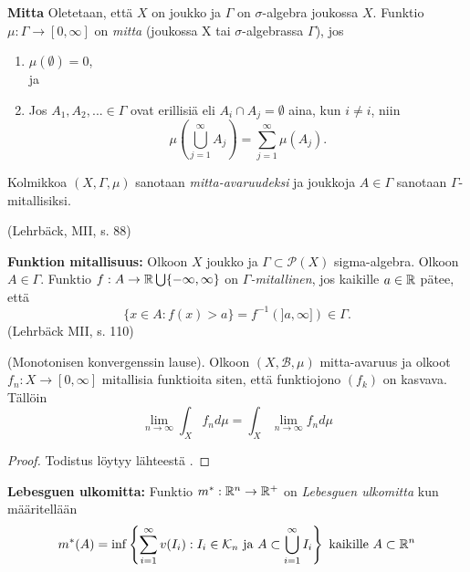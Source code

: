 \begin{definition}
    \textbf{Mitta} Oletetaan, että $X$ on joukko ja $\Gamma$ on $\sigma$-algebra joukossa $X$. Funktio $\mu : \Gamma \to [0, \infty]$ on \textit{mitta} (joukossa X tai $\sigma$-algebrassa $\Gamma$), jos 
    \begin{enumerate}
        \item $\mu(\emptyset) = 0$, \\
        ja
        \item Jos $A_1, A_2, ... \in \Gamma$ ovat erillisiä eli $A_i \cap A_j = \emptyset$ aina, kun $i \ne i$, niin
        $$\mu\left(\bigcup_{j=1}^\infty A_j \right) = \sum_{j=1}^\infty \mu(A_j).$$
    \end{enumerate}
    
    Kolmikkoa $(X,\Gamma, \mu)$ sanotaan \textit{mitta-avaruudeksi} ja joukkoja $A\in \Gamma$ sanotaan $\Gamma$-mitallisiksi.
    
    (Lehrbäck, MII, s. 88)
\end{definition}

\begin{definition}
    \textbf{Funktion mitallisuus:} Olkoon $X$ joukko ja $\Gamma \subset \mathcal P (X)$ sigma-algebra. Olkoon $A\in \Gamma$. Funktio $f: A \to \mathbb{R} \bigcup\{-\infty, \infty\}$ on \textit{$\Gamma$-mitallinen}, jos kaikille $a \in \mathbb{R}$ pätee, että
    \begin{equation*}
        \{x \in A : f(x) > a\} = f^{-1}(]a, \infty]) \in \Gamma.
    \end{equation*} (Lehrbäck MII, s. 110)
\end{definition}

\begin{theorem} \label{thm:monoConvThm}
    (Monotonisen konvergenssin lause). Olkoon $(X, \mathcal{B}, \mu)$ mitta-avaruus ja olkoot $f_n:X\to [0, \infty]$ mitallisia funktioita siten, että funktiojono $(f_k)$ on kasvava. Tällöin
    \begin{equation*}
        \lim_{n\to\infty} \int_X f_n d\mu = \int_X \lim_{n\to \infty} f_n d\mu
    \end{equation*}
\end{theorem}
\begin{proof}
    Todistus löytyy lähteestä \cite[p. 107]{MeasureTheoryTao}.
\end{proof}

\begin{definition}
    \textbf{Lebesguen ulkomitta:} Funktio $m^* : \mathbb{R}^n \to \mathbb{R}^+$ on \textit{Lebesguen ulkomitta} kun määritellään
    $$m^*(A) = \inf\left\{\sum_{i=1}^\infty v(I_i) : I_i \in \mathcal K_n \text{ ja } A \subset \bigcup_{i=1}^{\infty}I_i\right\} \text{ kaikille } A \subset \mathbb{R}^n$$
\end{definition}

